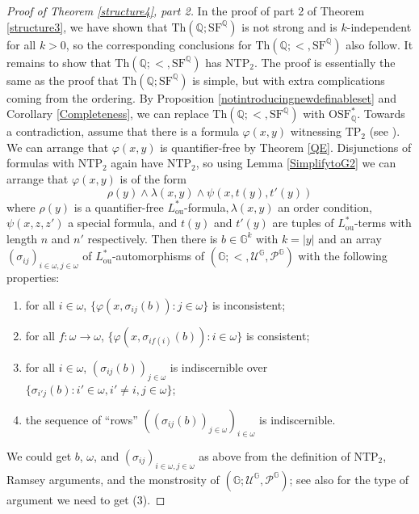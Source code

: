 \documentclass[letterpaper]{amsart}
\newcommand{\qq}{\mathbb{Q}}
\renewcommand{\gg}{\mathbb{G}}
\newcommand{\sU}{\mathscr{U}}
\newcommand{\sP}{\mathscr{P}}
\newcommand{\SQ}{\mathrm{SF}^\qq}
\newcommand{\OSFQ}{\mathrm{OSF}_{\qq}}
\begin{document}
\begin{proof}[Proof of Theorem \ref{structure4}, part 2]
In the proof of part 2 of Theorem \ref{structure3}, we have shown that $\text{Th}(\qq; \SQ)$ is not strong and is $k$-independent for all $k>0$, so the corresponding conclusions for $\text{Th}(\qq; <, \SQ)$ also follow. 
It remains to show that $\text{Th}(\qq;<, \SQ)$ has $\text{NTP}_2$. The proof is essentially the same as the proof that $\text{Th}(\qq; \SQ)$ is simple, but with extra complications coming from the ordering.
By Proposition \ref{notintroducingnewdefinableset} and  Corollary \ref{Completeness}, we can replace $\text{Th}(\qq;<, \SQ)$ with $\OSFQ^*$.  Towards a contradiction, assume that there is a formula $\varphi(x,y)$ witnessing $\text{TP}_2$ (see \cite[pp. 700-701]{Chernikov}).
We can arrange that $\varphi(x,y)$ is quantifier-free by  Theorem \ref{QE}. Disjunctions of formulas with $\text{NTP}_2$ again have $\text{NTP}_2$\cite[p. 701]{Chernikov},  so using Lemma \ref{SimplifytoG2} we can arrange that $\varphi(x,y)$ is of the form
$$  \rho(y) 
\wedge \lambda(x,y) \wedge \psi(x, t(y), t'(y))  $$
where 
$\rho(y)$ is a quantifier-free $L^*_{\mathrm{ou}}$-formula$, \lambda(x, y)$ an order condition, $\psi(x, z, z')$ a special formula, and $t(y)$ and $t'(y)$ are tuples of $L^*_{\mathrm{ou}}$-terms with length $n$ and $n'$ respectively.
Then there is $b \in \gg^{k}$ with $k=|y|$ and an array $(\sigma_{ij})_{ i \in \omega, j \in \omega}$  of $L_{\mathrm{ou}}^*$-automorphisms of $(\gg; <, \sU^\gg, \sP^\gg)$ with the following properties:
\begin{enumerate}
\item for all $i \in \omega$, $\{ \varphi(x, \sigma_{ij}(b)) : j \in \omega   \}$ is inconsistent;
\item for all $f: \omega \to \omega$, $\{ \varphi(x, \sigma_{if(i)}(b)): i \in \omega\}$ is consistent;
\item for all $i \in \omega$,  $(\sigma_{ij}(b))_{j \in \omega}$ is indiscernible over  $\{ \sigma_{i'j}(b) : i' \in \omega, i'\neq i, j \in \omega  \}$;
\item the sequence of ``rows'' $( (\sigma_{ij}(b))_{j \in \omega})_{i \in \omega}$ is indiscernible.
\end{enumerate}
We could get $b$, $\omega$, and $(\sigma_{ij})_{ i \in \omega, j \in \omega}$ as above  from the definition of $\text{NTP}_2$, Ramsey arguments, and the monstrosity of $(\gg; \sU^\gg, \sP^\gg)$; see also  \cite[p. 697]{Chernikov} for the type of argument we need to get  (3).


\end{proof}
\end{document}
